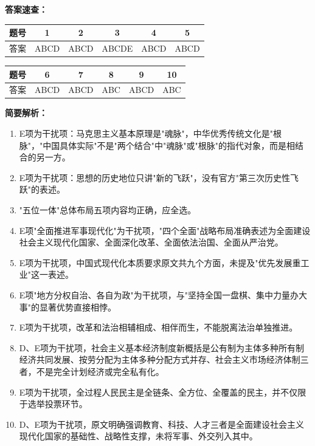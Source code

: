 \documentclass[12pt, a4paper]{article}
\begin{document}
\begin{answerbox}

\textbf{答案速查：}

\begin{center}
\begin{tabular}{|c|c|c|c|c|c|}
\hline
题号 & 1 & 2 & 3 & 4 & 5 \\
\hline
答案 & ABCD & ABCD & ABCDE & ABCD & ABCD \\
\hline
\end{tabular}

\vspace{4pt}

\begin{tabular}{|c|c|c|c|c|c|}
\hline
题号 & 6 & 7 & 8 & 9 & 10 \\
\hline
答案 & ABCD & ABCD & ABC & ABCD & ABC \\
\hline
\end{tabular}
\end{center}

\vspace{8pt}
\textbf{简要解析：}

\begin{enumerate}[itemsep=2pt, topsep=4pt, leftmargin=1.6em]
\item E项为干扰项：马克思主义基本原理是"魂脉"，中华优秀传统文化是"根脉"，"中国具体实际"不是"两个结合"中"魂脉"或"根脉"的指代对象，而是相结合的另一方。
\item E项为干扰项：思想的历史地位只讲"新的飞跃"，没有官方"第三次历史性飞跃"的表述。
\item "五位一体"总体布局五项内容均正确，应全选。
\item E项"全面推进军事现代化"为干扰项，"四个全面"战略布局准确表述为全面建设社会主义现代化国家、全面深化改革、全面依法治国、全面从严治党。
\item E项为干扰项，中国式现代化本质要求原文共九个方面，未提及"优先发展重工业"这一表述。
\item E项"地方分权自治、各自为政"为干扰项，与"坚持全国一盘棋、集中力量办大事"的显著优势直接相悖。
\item E项为干扰项，改革和法治相辅相成、相伴而生，不能脱离法治单独推进。
\item D、E项为干扰项，社会主义基本经济制度新概括是公有制为主体多种所有制经济共同发展、按劳分配为主体多种分配方式并存、社会主义市场经济体制三者，不是完全计划经济或完全私有化。
\item E项为干扰项，全过程人民民主是全链条、全方位、全覆盖的民主，并不仅限于选举投票环节。
\item D、E项为干扰项，原文明确强调教育、科技、人才三者是全面建设社会主义现代化国家的基础性、战略性支撑，未将军事、外交列入其中。
\end{enumerate}

\end{answerbox}
\end{document}
